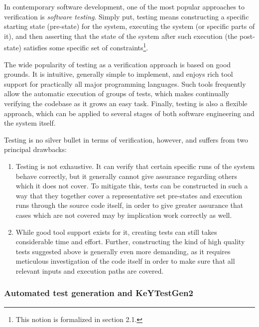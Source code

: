 \documentclass{article}
\newcommand{\tmem}[1]{{\em #1\/}}
\newenvironment{enumeratenumeric}{\begin{enumerate}[1.] }{\end{enumerate}}
\begin{document}
In contemporary software development, one of the most popular approaches to
verification is {\tmem{software testing}}. Simply put, testing means
constructing a specific starting state (pre-state) for the system, executing
the system (or specific parts of it), and then asserting that the state of the
system after such execution (the post-state) satisfies some specific set of
constraints{\footnote{This notion is formalized in section 2.1.}}.



The wide popularity of testing as a verification approach is based on good
grounds. It is intuitive, generally simple to implement, and enjoys rich tool
support for practically all major programming languages. Such tools frequently
allow the automatic execution of groups of tests, which makes continually
verifying the codebase as it grows an easy task. Finally, testing is also a
flexible approach, which can be applied to several stages of both software
engineering and the system itself.



Testing is no silver bullet in terms of verification, however, and suffers
from two principal drawbacks:
\begin{enumeratenumeric}
  \item Testing is not exhaustive. It can verify that certain specific runs of
  the system behave correctly, but it generally cannot give assurance
  regarding others which it does not cover. To mitigate this, tests can be
  constructed in such a way that they together cover a representative set
  pre-states and execution runs through the source code itself, in order to
  give greater assurance that cases which are not covered may by implication
  work correctly as well.
  
  \item While good tool support exists for it, creating tests can still takes
  considerable time and effort. Further, constructing the kind of high quality
  tests suggested above is generally even more demanding, as it requires
  meticulous investigation of the code itself in order to make sure that all
  relevant inputs and execution paths are covered.
  
  
\end{enumeratenumeric}

\subsubsection{Automated test generation and KeYTestGen2}
\end{document}
